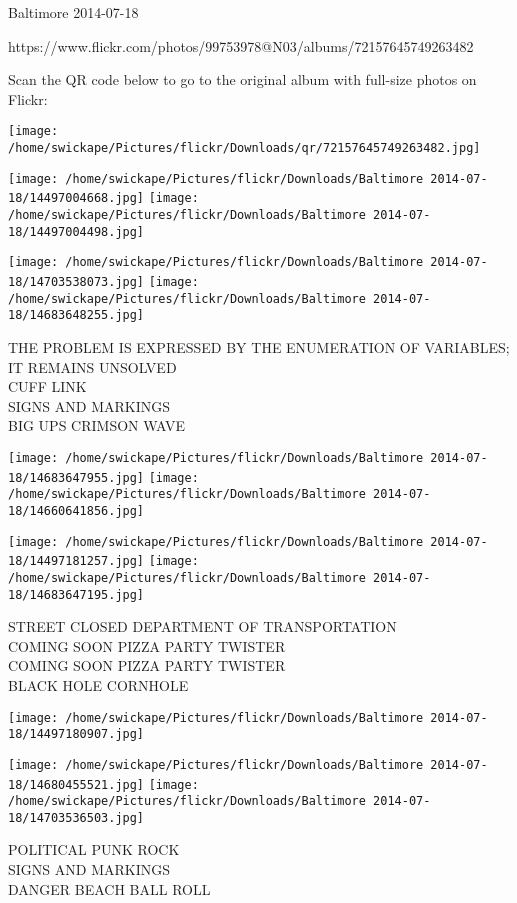 \documentclass[10pt,letterpaper]{article}
\begin{document}
Baltimore 2014-07-18

https://www.flickr.com/photos/99753978@N03/albums/72157645749263482

Scan the QR code below to go to the original album with full-size photos on Flickr:

\texttt{[image: /home/swickape/Pictures/flickr/Downloads/qr/72157645749263482.jpg]}
\pagebreak

\texttt{[image: /home/swickape/Pictures/flickr/Downloads/Baltimore 2014-07-18/14497004668.jpg]}
\texttt{[image: /home/swickape/Pictures/flickr/Downloads/Baltimore 2014-07-18/14497004498.jpg]}

\texttt{[image: /home/swickape/Pictures/flickr/Downloads/Baltimore 2014-07-18/14703538073.jpg]}
\texttt{[image: /home/swickape/Pictures/flickr/Downloads/Baltimore 2014-07-18/14683648255.jpg]}

THE PROBLEM IS EXPRESSED BY THE ENUMERATION OF VARIABLES; IT REMAINS UNSOLVED\\
CUFF LINK\\
SIGNS AND MARKINGS\\
BIG UPS CRIMSON WAVE
\pagebreak

\texttt{[image: /home/swickape/Pictures/flickr/Downloads/Baltimore 2014-07-18/14683647955.jpg]}
\texttt{[image: /home/swickape/Pictures/flickr/Downloads/Baltimore 2014-07-18/14660641856.jpg]}

\texttt{[image: /home/swickape/Pictures/flickr/Downloads/Baltimore 2014-07-18/14497181257.jpg]}
\texttt{[image: /home/swickape/Pictures/flickr/Downloads/Baltimore 2014-07-18/14683647195.jpg]}

STREET CLOSED DEPARTMENT OF TRANSPORTATION\\
COMING SOON PIZZA PARTY TWISTER\\
COMING SOON PIZZA PARTY TWISTER\\
BLACK HOLE CORNHOLE
\pagebreak

\texttt{[image: /home/swickape/Pictures/flickr/Downloads/Baltimore 2014-07-18/14497180907.jpg]}

\vspace{0.25in}
\texttt{[image: /home/swickape/Pictures/flickr/Downloads/Baltimore 2014-07-18/14680455521.jpg]}
\texttt{[image: /home/swickape/Pictures/flickr/Downloads/Baltimore 2014-07-18/14703536503.jpg]}

POLITICAL PUNK ROCK\\
SIGNS AND MARKINGS\\
DANGER BEACH BALL ROLL
\pagebreak
\end{document}
